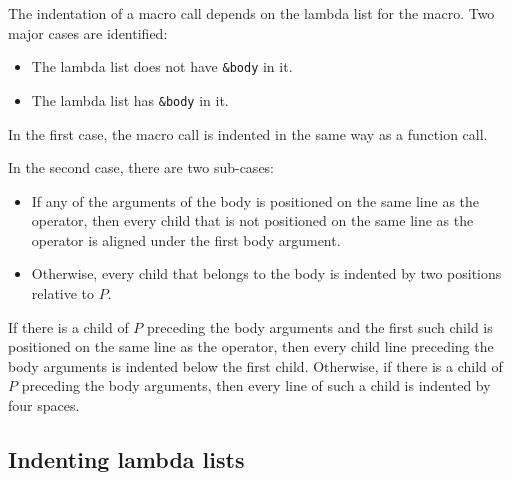 The indentation of a macro call depends on the lambda list for the
macro.  Two major cases are identified:

\begin{itemize}
\item The lambda list does not have \texttt{\&body} in it.
\item The lambda list has \texttt{\&body} in it.
\end{itemize}

In the first case, the macro call is indented in the same way as a
function call.

In the second case, there are two sub-cases:

\begin{itemize}
\item If any of the arguments of the body is positioned on the same
  line as the operator, then every child that is not positioned on the
  same line as the operator is aligned under the first body argument.
\item Otherwise, every child that belongs to the body is indented by
  two positions relative to $P$.
\end{itemize}

If there is a child of $P$ preceding the body arguments and the first
such child is positioned on the same line as the operator, then every
child line preceding the body arguments is indented below the first
child.  Otherwise, if there is a child of $P$ preceding the body
arguments, then every line of such a child is indented by four spaces.

\subsection{Indenting lambda lists}
